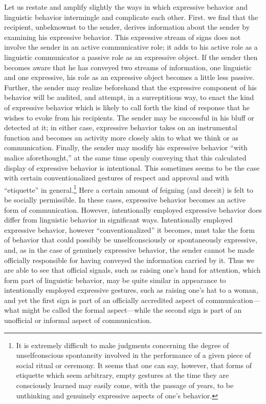\documentclass[openany,nobib]{tufte-book}
\begin{document}
Let us restate and amplify slightly the ways in which ex­pressive
behavior and linguistic behavior intermingle and com­plicate each other.
First. we find that the recipient, unbe­knownst to the sender, derives
information about the sender by examining his expressive behavior. This
expressive stream of signs does not involve the sender in an active
communicative role; it adds to his active role as a linguistic
communicator a passive role as an expressive object. If the sender then
becomes aware that he has conveyed two streams of information, one
linguistic and one expressive, his role as an expressive object becomes
a little less passive. Further, the sender may realize beforehand that
the expressive component of his behavior will be audited, and attempt,
in a surreptitious way, to enact the kind of expressive behavior which
is likely to call forth the kind of response that he wishes to evoke
from his recipients. The sender may be successful in his bluff or
detected at it; in either case, ex­pressive behavior takes on an
instrumental function and becomes an activity more closely akin to what
we think or as communication. Finally, the sender may modify his
expressive behavior ``with malice aforethought,'' at the same time
openly conveying that this calculated display of expressive behavior is
intentional. This sometimes seems to be the case with certain
conventionalized gestures of respect and approval and with ``etiquette''
in general.\footnote{It is extremely difficult to make judgments
  concerning the degree of unselfconscious spontaneity involved in the
  per­formance of a given piece of social ritual or ceremony. It seems
  that one can say, however, that forms of etiquette which seem
  arbitrary, empty gestures at the time they are consciously learned may
  easily come, with the passage of years, to be unthinking and genuinely
  expressive aspects of one's behavior.} Here a certain amount of
feigning (and deceit) is felt to be socially permissible. In these
cases, expressive behavior becomes an active form of communication.
However, in­tentionally employed expressive behavior does differ from
lin­guistic behavior in significant ways. Intentionally employed
expressive behavior, however ``conventionalized'' it becomes, must take
the form of behavior that could possibly be unselfconsciously or
spontaneously expressive, and, as in the case of genuinely expressive
behavior, the sender cannot be made officially re­sponsible for having
conveyed the information carried by it. Thus we are able to see that
official signals, such as raising one's hand for attention, which form
part of linguistic behavior, may be quite similar in appearance to
intentionally employed ex­pressive gestures, such as raising one's hat to
a woman, and yet the first sign is part of an officially accredited
aspect of communication---what might be called the formal aspect---while
the second sign is part of an unofficial or informal aspect of
communication.
\end{document}
